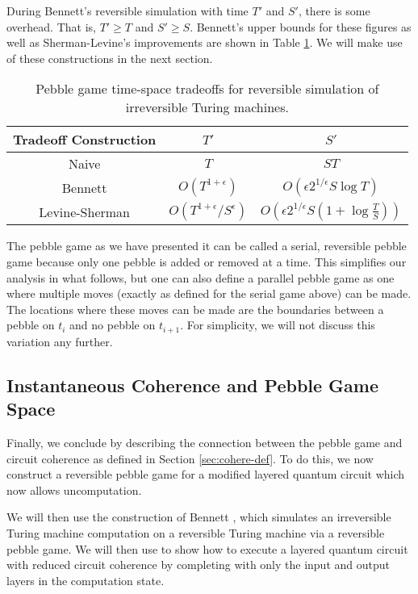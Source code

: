 During Bennett's reversible
simulation with time $T'$ and $S'$, there is some overhead. That is,
$T' \ge T$ and $S' \ge S$. Bennett's upper bounds for these figures
as well as Sherman-Levine's improvements \cite{Levine1990} are shown
in Table \ref{tab:pebble-ts}. We will make use of these constructions in
the next section.

\begin{table}[hbt!]
\begin{tabular}{|c|c|c|}
\hline
Tradeoff Construction           & $T'$                             & $S'$ \\
\hline
Naive                           & $T$                              & $ST$\\
Bennett \cite{Bennett1989}      & $O(T^{1+\epsilon})$              & $O(\epsilon 2^{1/\epsilon} S \log T)$ \\
Levine-Sherman \cite{Levine1990} & $O(T^{1+\epsilon}/S^{\epsilon})$ & $O(\epsilon 2^{1/\epsilon} S (1 + \log\frac{T}{S}))$ \\
\hline
\hline

\end{tabular}
\caption{Pebble game time-space tradeoffs for reversible simulation of
irreversible Turing machines.}
\label{tab:pebble-ts}
\end{table}

The pebble game as we have presented it can be called a serial, reversible
pebble game because only one pebble is added or removed at a time. This
simplifies our analysis in what follows, but one can also define
a parallel pebble game as one where multiple moves (exactly as
defined for the serial game above) can be made. The locations where these
moves can be made are the boundaries between
a pebble on $t_i$ and no pebble on $t_{i+1}$. For simplicity,
we will not discuss this variation any further.

\subsection{Instantaneous Coherence and Pebble Game Space}
\label{subsec:cohere-equiv}

Finally, we conclude by describing the connection between the pebble game
and circuit coherence as defined in Section \ref{sec:cohere-def}. To do this,
we now construct a reversible pebble game for a modified layered quantum
circuit which now allows uncomputation.

We will then use the construction of Bennett \cite{Bennett1989},
which simulates an irreversible Turing machine computation on a
reversible Turing machine via a reversible pebble game. We will then
use to show how to execute a layered quantum circuit with reduced
circuit coherence by completing with only the input and output layers
in the computation state.

